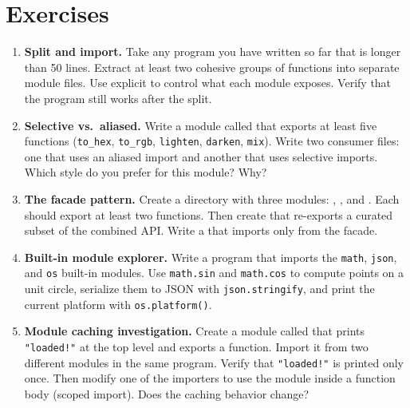 \section{Exercises}\label{sec:ch28-exercises}

\begin{enumerate}
  \item \textbf{Split and import.}
  Take any program you have written so far that is longer than 50 lines.
  Extract at least two cohesive groups of functions into separate module files.
  Use explicit  to control what each module exposes.
  Verify that the program still works after the split.

  \item \textbf{Selective vs.\ aliased.}
  Write a module called  that exports at least five functions (\lstinline|to_hex|, \lstinline|to_rgb|, \lstinline|lighten|, \lstinline|darken|, \lstinline|mix|).
  Write two consumer files: one that uses an aliased import and another that uses selective imports.
  Which style do you prefer for this module?
  Why?

  \item \textbf{The facade pattern.}
  Create a  directory with three modules: , , and .
  Each should export at least two functions.
  Then create  that re-exports a curated subset of the combined API\@.
  Write a  that imports only from the facade.

  \item \textbf{Built-in module explorer.}
  Write a program that imports the \texttt{math}, \texttt{json}, and \texttt{os} built-in modules.
  Use \lstinline|math.sin| and \lstinline|math.cos| to compute points on a unit circle, serialize them to JSON with \lstinline|json.stringify|, and print the current platform with \lstinline|os.platform()|.

  \item \textbf{Module caching investigation.}
  Create a module called  that prints \lstinline|"loaded!"| at the top level and exports a function.
  Import it from two different modules in the same program.
  Verify that \lstinline|"loaded!"| is printed only once.
  Then modify one of the importers to use the module inside a function body (scoped import).
  Does the caching behavior change?
\end{enumerate}

